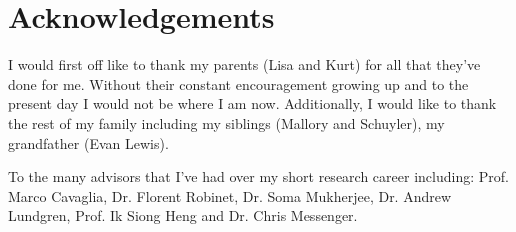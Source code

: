 \chapter{Acknowledgements}

I would first off like to thank my parents (Lisa and Kurt) for all that they've done for me. Without their constant encouragement growing up and to the present day I would not be where I am now. Additionally, I would like to thank the rest of my family including my siblings (Mallory and Schuyler), my grandfather (Evan Lewis). 

To the many advisors that I've had over my short research career including: Prof. Marco Cavaglia, Dr. Florent Robinet, Dr. Soma Mukherjee, Dr. Andrew Lundgren, Prof. Ik Siong Heng and Dr. Chris Messenger.
